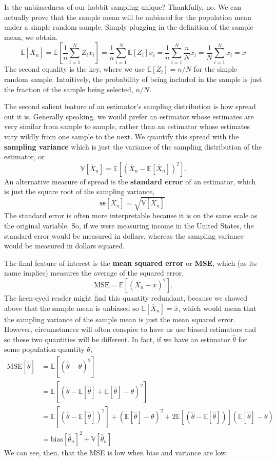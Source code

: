 \documentclass[
  letterpaper,
  DIV=11,
  numbers=noendperiod]{scrreprt}
\newcommand{\E}{\mathbb{E}}
\newcommand{\V}{\mathbb{V}}
\newcommand{\se}{\textsf{se}}
\newcommand{\Xbar}{\overline{X}}
\theoremstyle{definition}
\theoremstyle{definition}
\theoremstyle{plain}
\theoremstyle{remark}
\begin{document}
Is the unbiasedness of our hobbit sampling unique? Thankfully, no. We
can actually prove that the sample mean will be unbiased for the
population mean under a simple random sample. Simply plugging in the
definition of the sample mean, we obtain. \[ 
\E[\Xbar_{n}] = \E\left[\frac{1}{n} \sum_{i=1}^{N} Z_{i}x_{i}\right] = \frac{1}{n} \sum_{i=1}^{N} \E[Z_{i}]x_{i} = \frac{1}{n} \sum_{i=1}^{N} \frac{n}{N}x_{i} = \frac{1}{N} \sum_{i=1}^{N}x_{i} = \overline{x} 
\] The second equality is the key, where we use \(\E[Z_i] = n/N\) for
the simple random sample. Intuitively, the probability of being included
in the sample is just the fraction of the sample being selected,
\(n/N\).

The second salient feature of an estimator's sampling distribution is
how spread out it is. Generally speaking, we would prefer an estimator
whose estimates are very similar from sample to sample, rather than an
estimator whose estimates vary wildly from one sample to the next. We
quantify this spread with the \textbf{sampling variance} which is just
the variance of the sampling distribution of the estimator, or \[
\V[\Xbar_n] = \E[(\Xbar_n - \E[\Xbar_n])^2].
\] An alternative measure of spread is the \textbf{standard error} of an
estimator, which is just the square root of the sampling variance, \[
\se[\Xbar_n] = \sqrt{\V[\Xbar_n]}.
\] The standard error is often more interpretable because it is on the
same scale as the original variable. So, if we were measuring income in
the United States, the standard error would be measured in dollars,
whereas the sampling variance would be measured in dollars squared.

The final feature of interest is the \textbf{mean squared error} or
\textbf{MSE}, which (as its name implies) measures the average of the
squared error, \[
\text{MSE} = \E[(\Xbar_n-\overline{x})^2].
\] The keen-eyed reader might find this quantity redundant, because we
showed above that the sample mean is unbiased so
\(\E[\Xbar_n] = \overline{x}\), which would mean that the sampling
variance of the sample mean is just the mean squared error. However,
circumstances will often conspire to have us use biased estimators and
so these two quantities will be different. In fact, if we have an
estimator \(\widehat{\theta}\) for some population quantity \(\theta\),
\[ 
\begin{aligned}
\text{MSE}[\widehat{\theta}] &= \E[(\widehat{\theta} - \theta)^2] \\
&= \E[(\widehat{\theta} - \E[\widehat{\theta}] + \E[\widehat{\theta}] - \theta)^2] \\
&= \E[(\widehat{\theta} - \E[\widehat{\theta}])^2] + \left(\E[\widehat{\theta}] - \theta\right) ^ 2 + 2\E[(\widehat{\theta} - \E[\widehat{\theta}])]\left(\E[\widehat{\theta}] - \theta\right) \\
&= \text{bias}[\widehat{\theta}_n]^2 + \V[\widehat{\theta}_n]  
\end{aligned}
\] We can see, then, that the MSE is low when bias and variance are low.
\end{document}
